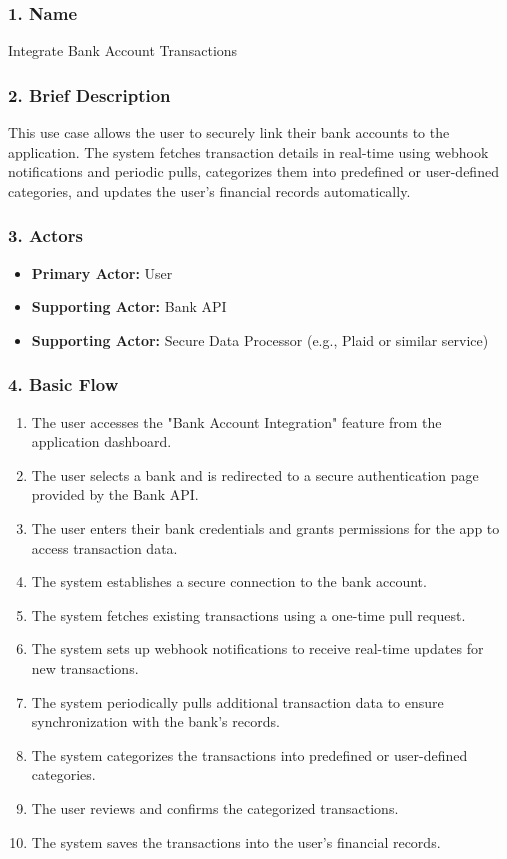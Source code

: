 \subsubsection*{1. Name}
Integrate Bank Account Transactions

\subsubsection*{2. Brief Description}
This use case allows the user to securely link their bank accounts to the application. The system fetches transaction details in real-time using webhook notifications and periodic pulls, categorizes them into predefined or user-defined categories, and updates the user's financial records automatically.

\subsubsection*{3. Actors}
\begin{itemize}
    \item \textbf{Primary Actor:} User
    \item \textbf{Supporting Actor:} Bank API
    \item \textbf{Supporting Actor:} Secure Data Processor (e.g., Plaid or similar service)
\end{itemize}

\subsubsection*{4. Basic Flow }
\begin{enumerate}
    \item The user accesses the "Bank Account Integration" feature from the application dashboard.
    \item The user selects a bank and is redirected to a secure authentication page provided by the Bank API.
    \item The user enters their bank credentials and grants permissions for the app to access transaction data.
    \item The system establishes a secure connection to the bank account.
    \item The system fetches existing transactions using a one-time pull request.
    \item The system sets up webhook notifications to receive real-time updates for new transactions.
    \item The system periodically pulls additional transaction data to ensure synchronization with the bank’s records.
    \item The system categorizes the transactions into predefined or user-defined categories.
    \item The user reviews and confirms the categorized transactions.
    \item The system saves the transactions into the user's financial records.
\end{enumerate}

